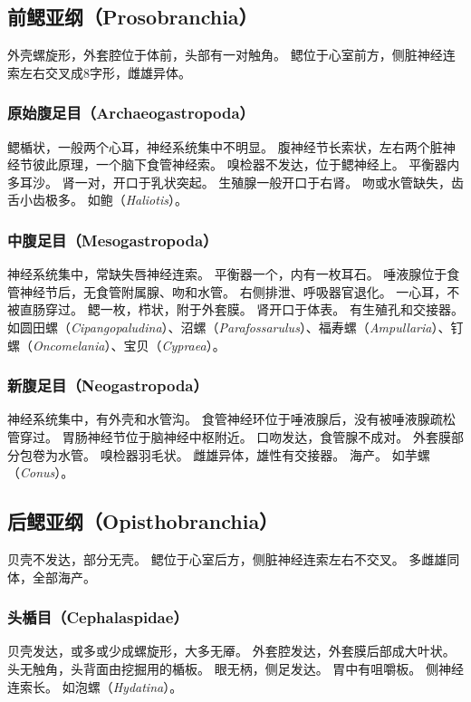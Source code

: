 \documentclass[11pt]{article}
\begin{document}
\subsection{前鳃亚纲（Prosobranchia）}
外壳螺旋形，外套腔位于体前，头部有一对触角。
鳃位于心室前方，侧脏神经连索左右交叉成8字形，雌雄异体。

\subsubsection{原始腹足目（Archaeogastropoda）}
鳃楯状，一般两个心耳，神经系统集中不明显。
腹神经节长索状，左右两个脏神经节彼此原理，一个脑下食管神经索。
嗅检器不发达，位于鳃神经上。
平衡器内多耳沙。
肾一对，开口于乳状突起。
生殖腺一般开口于右肾。
吻或水管缺失，齿舌小齿极多。
如鲍（\textit{Haliotis}）。

\subsubsection{中腹足目（Mesogastropoda）}
神经系统集中，常缺失唇神经连索。
平衡器一个，内有一枚耳石。
唾液腺位于食管神经节后，无食管附属腺、吻和水管。
右侧排泄、呼吸器官退化。
一心耳，不被直肠穿过。
鳃一枚，栉状，附于外套膜。
肾开口于体表。
有生殖孔和交接器。
如圆田螺（\textit{Cipangopaludina}）、沼螺（\textit{Parafossarulus}）、福寿螺（\textit{Ampullaria}）、钉螺（\textit{Oncomelania}）、宝贝（\textit{Cypraea}）。

\subsubsection{新腹足目（Neogastropoda）}
神经系统集中，有外壳和水管沟。
食管神经环位于唾液腺后，没有被唾液腺疏松管穿过。
胃肠神经节位于脑神经中枢附近。
口吻发达，食管腺不成对。
外套膜部分包卷为水管。
嗅检器羽毛状。
雌雄异体，雄性有交接器。
海产。
如芋螺（\textit{Conus}）。

\subsection{后鳃亚纲（Opisthobranchia）}
贝壳不发达，部分无壳。
鳃位于心室后方，侧脏神经连索左右不交叉。
多雌雄同体，全部海产。

\subsubsection{头楯目（Cephalaspidae）}
贝壳发达，或多或少成螺旋形，大多无厣。
外套腔发达，外套膜后部成大叶状。
头无触角，头背面由挖掘用的楯板。
眼无柄，侧足发达。
胃中有咀嚼板。
侧神经连索长。
如泡螺（\textit{Hydatina}）。
\end{document}
